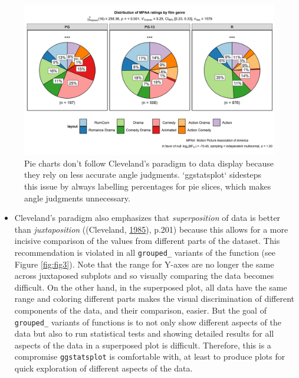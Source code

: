 \documentclass[]{article}
\providecommand{\tightlist}{%
  \setlength{\itemsep}{0pt}\setlength{\parskip}{0pt}}
\begin{document}
\begin{figure}[H]
\includegraphics[width=1\linewidth]{./figures/paper-fig2-1} \caption{Pie charts don't follow Cleveland's paradigm to data display because they rely on less accurate angle judgments. `ggstatsplot` sidesteps this issue by always labelling percentages for pie slices, which makes angle judgments unnecessary.}\label{fig:fig2}
\end{figure}

\begin{itemize}
\tightlist
\item
  Cleveland's paradigm also emphasizes that \emph{superposition} of data is better
  than \emph{juxtaposition} ((Cleveland, \protect\hyperlink{ref-clevelandElementsGraphingData1985}{1985}), p.201) because
  this allows for a more incisive comparison of the values from different
  parts of the dataset. This recommendation is violated in all \texttt{grouped\_}
  variants of the function (see Figure \ref{fig:fig3}). Note that the range
  for Y-axes are no longer the same across juxtaposed subplots and so visually
  comparing the data becomes difficult. On the other hand, in the superposed
  plot, all data have the same range and coloring different parts makes the
  visual discrimination of different components of the data, and their
  comparison, easier. But the goal of \texttt{grouped\_} variants of functions is to
  not only show different aspects of the data but also to run statistical
  tests and showing detailed results for all aspects of the data in a
  superposed plot is difficult. Therefore, this is a compromise \texttt{ggstatsplot}
  is comfortable with, at least to produce plots for quick exploration of
  different aspects of the data.
\end{itemize}
\end{document}
